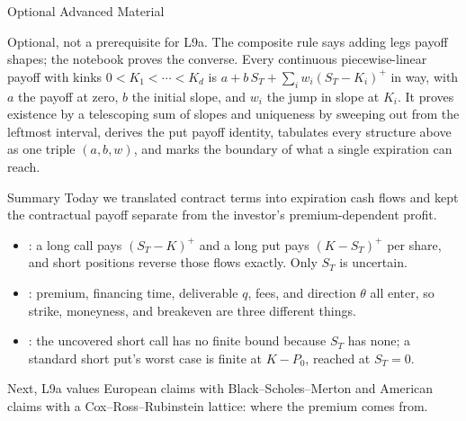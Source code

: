 \documentclass[aspectratio=169,11pt]{beamer}
\newcommand{\ST}{S_{T}}
\begin{document}
\begin{frame}{Optional Advanced Material}
  \vspace{0.4em}
  {\normalsize\textbf{} \par
  }

  \vspace{0.7em}
  Optional, not a prerequisite for L9a. The composite rule says adding legs
   payoff shapes; the notebook proves the converse. Every
  continuous piecewise-linear payoff with kinks $0<K_1<\cdots<K_d$ is
  $a+b\,\ST+\sum_i w_i(\ST-K_i)^{+}$ in  way, with $a$ the
  payoff at zero, $b$ the initial slope, and $w_i$ the jump in slope at $K_i$. It
  proves existence by a telescoping sum of slopes and uniqueness by sweeping out
  from the leftmost interval, derives the put payoff identity, tabulates every
  structure above as one triple $(a,b,w)$, and marks the boundary of what a
  single expiration can reach.
\end{frame}

\begin{frame}{Summary}
  Today we translated contract terms into expiration cash flows and kept the
  contractual payoff separate from the investor's premium-dependent profit.

  {\large\textbf{}}
  \begin{itemize}\setlength{\itemsep}{0.1em}
    \item {}: a long call pays
      $(\ST-K)^{+}$ and a long put pays $(K-\ST)^{+}$ per share, and short
      positions reverse those flows exactly. Only $\ST$ is uncertain.
    \item {}: premium, financing time,
      deliverable $q$, fees, and direction $\theta$ all enter, so strike,
      moneyness, and breakeven are three different things.
    \item {}:
      the uncovered short call has no finite bound because $\ST$ has none; a
      standard short put's worst case is finite at $K-P_0$, reached at $\ST=0$.
  \end{itemize}
  Next, L9a values European claims with Black--Scholes--Merton and American
  claims with a Cox--Ross--Rubinstein lattice: where the premium comes from.
\end{frame}

\end{document}
